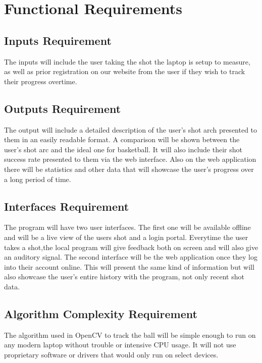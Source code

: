 \chapter{Functional Requirements}

\section{Inputs Requirement}
\hspace*{4mm} The inputs will include the user taking the shot the laptop is setup to measure, as well as prior registration on our website from the user if they wish to track their progress overtime. 

\section{Outputs Requirement}
\hspace*{4mm} The output will include a detailed description of the user's shot arch presented to them in an easily readable format. A comparison will be shown between the user's shot arc and the ideal one for basketball. It will also include their shot success rate presented to them via the web interface. Also on the web application there will be statistics and other data that will showcase the user's progress over a long period of time. 

\section{Interfaces Requirement}
\hspace*{4mm} The program will have two user interfaces. The first one will be available offline and will be a live view of the users shot and a login portal. Everytime the user takes a shot,the local program will give feedback both on screen and will also give an auditory signal. The second interface will be the web application once they log into their account online. This will present the same kind of information but will also showcase the user's entire history with the program, not only recent shot data. 

\section{Algorithm Complexity Requirement}
\hspace*{4mm} The algorithm used in OpenCV to track the ball will be simple enough to run on any modern laptop without trouble or intensive CPU usage. It will not use proprietary software or drivers that would only run on select devices. 

